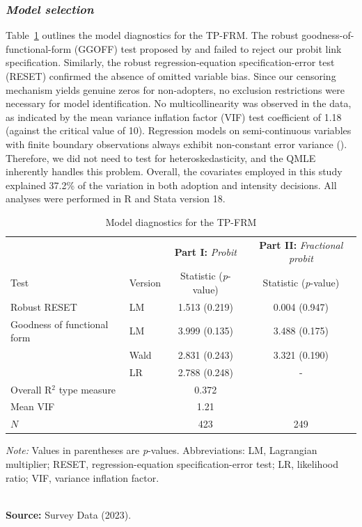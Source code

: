 \documentclass[fleqn,twoside,reqno]{article}
\begin{document}
\subsubsection{\textit{Model selection}}
Table~\ref{tab:3} outlines the model diagnostics for the TP-FRM. The robust goodness-of-functional-form (GGOFF) test proposed by \cite{Ramalho2011} and \cite{Ramalho2014} failed to reject our probit link specification. Similarly, the robust \cite{Ramsey1969} regression-equation specification-error test (RESET) confirmed the absence of omitted variable bias. Since our censoring mechanism yields genuine zeros for non-adopters, no exclusion restrictions were necessary for model identification. No multicollinearity was observed in the data, as indicated by the mean variance inflation factor (VIF) test coefficient of 1.18 (against the critical value of 10). Regression models on semi-continuous variables with finite boundary observations always exhibit non-constant error variance (\cite{Papke1996}). Therefore, we did not need to test for heteroskedasticity, and the QMLE inherently handles this problem. Overall, the covariates employed in this study explained 37.2\% of the variation in both adoption and intensity decisions. All analyses were performed in R and Stata version 18.
\begin{table}[htbp]
\centering
\caption{Model diagnostics for the TP-FRM}
\label{tab:3}
\begin{tabularx}{0.8\textwidth\center}{lXcc}
\hline
& & \textbf{Part I:} \textit{Probit} & \textbf{Part II:} \textit{Fractional probit} \\
\cmidrule(lr){3-3} \cmidrule(lr){4-4}
Test & Version & Statistic (\textit{p}-value) & Statistic (\textit{p}-value)\\
\hline
Robust RESET & LM & 1.513 (0.219) & 0.004 (0.947) \\
Goodness of functional form & LM & 3.999 (0.135) & 3.488 (0.175) \\
 & Wald & 2.831 (0.243) & 3.321 (0.190) \\
 & LR & 2.788 (0.248) & - \\
Overall R$^2$ type measure & & 0.372 & \\
Mean VIF & & 1.21 & \\
\hline
$N$ & & 423 & 249 \\
\hline
\end{tabularx}
\smallskip
    \parbox{0.7\textwidth}{\small\textit{Note:} Values in parentheses are \textit{p}-values. Abbreviations: LM, Lagrangian multiplier; RESET, regression-equation specification-error test; LR, likelihood ratio; VIF, variance inflation factor.}\\
    \textbf{Source:} Survey Data (2023).
\end{table}
\end{document}

